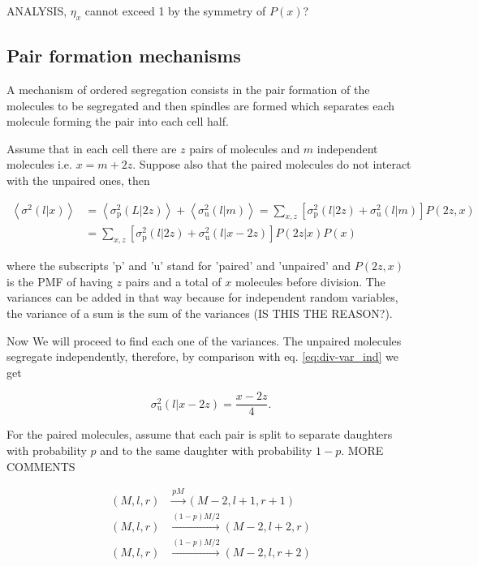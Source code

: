 ANALYSIS, $\eta_x$ cannot exceed 1 by the symmetry of $P(x)$?

\subsection{Pair formation mechanisms}
A mechanism of ordered segregation consists in the pair formation of the molecules to be segregated and then spindles are formed which separates each molecule forming the pair into each cell half.

Assume that in each cell there are $z$ pairs of molecules and $m$ independent molecules i.e. $x=m+2z$. Suppose also that the paired molecules do not interact with the unpaired ones, then

\begin{equation}
  \label{eq:div-pu}
  \begin{split}
  \left\langle\sigma^2(l|x)\right\rangle &= \left\langle\sigma^2_\text{p}(L|2z)\right\rangle + \left\langle\sigma^2_\text{u}(l|m)\right\rangle = \sum_{x,z}\left[\sigma^2_\text{p}(l|2z) + \sigma^2_\text{u}(l|m)\right]P(2z,x)\\
  &= \sum_{x,z}\left[\sigma^2_\text{p}(l|2z) + \sigma^2_\text{u}(l|x-2z)\right]P(2z|x)P(x)
  \end{split}
\end{equation}

where the subscripts 'p' and 'u' stand for 'paired' and 'unpaired' and $P(2z,x)$ is the PMF of having $z$ pairs and a total of $x$ molecules before division. The variances can be added in that way because for independent random variables, the variance of a sum is the sum of the variances (IS THIS THE REASON?).

Now We will proceed to find each one of the variances. The unpaired molecules segregate independently, therefore, by comparison with eq. \eqref{eq:div-var_ind} we get

\begin{equation}
  \label{eq:div-u}
  \sigma^2_\text{u}(l|x-2z) = \frac{x-2z}{4}.
\end{equation}

For the paired molecules, assume that each pair is split to separate daughters with probability $p$ and to the same daughter with probability $1-p$. MORE COMMENTS

\begin{equation}
  \begin{split}
    (M,l,r)&\xrightarrow{pM}(M-2,l+1,r+1)\\
    (M,l,r)&\xrightarrow{(1-p)M/2}(M-2,l+2,r)\\
    (M,l,r)&\xrightarrow{(1-p)M/2}(M-2,l,r+2)
  \end{split}
\end{equation}

